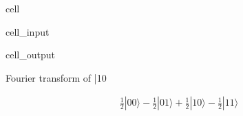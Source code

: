 \documentclass[letterpaper,10pt,english]{jupyterBook}
\begin{document}
\begin{sphinxuseclass}{cell}\begin{sphinxVerbatimInput}

\begin{sphinxuseclass}{cell_input}
\begin{sphinxVerbatim}[commandchars=\\\{\}]

\end{sphinxVerbatim}

\end{sphinxuseclass}\end{sphinxVerbatimInput}
\begin{sphinxVerbatimOutput}

\begin{sphinxuseclass}{cell_output}
\begin{sphinxVerbatim}[commandchars=\\\{\}]
Fourier transform of |10\PYGZgt{}
\end{sphinxVerbatim}
\begin{equation*}
\begin{split}\frac{1}{2} |00\rangle- \frac{1}{2} |01\rangle+\frac{1}{2} |10\rangle- \frac{1}{2} |11\rangle\end{split}
\end{equation*}
\end{sphinxuseclass}\end{sphinxVerbatimOutput}

\end{sphinxuseclass}
\end{document}
